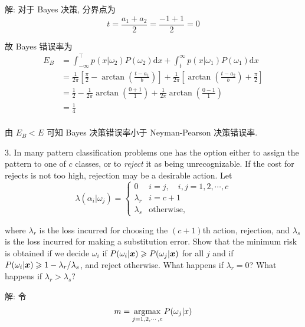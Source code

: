 \documentclass{article}
\begin{document}
解: 对于 Bayes 决策, 分界点为
\begin{equation}
  t=\frac{a_1+a_2}{2}=\frac{-1+1}{2}=0
\end{equation}

故 Bayes 错误率为
\begin{equation}
  \begin{aligned}
    E_B
    &=\int_{-\infty}^{\top} p(x|\omega_2)P(\omega_2)\mathrm{d}x+\int_t^\infty p(x|\omega_1)P(\omega_1)\mathrm{d}x\\
    &=\frac{1}{2\pi}\left[\frac{\pi}{2}-\arctan\left(\frac{t-a_1}{b}\right)\right]+\frac{1}{2\pi}\left[\arctan\left(\frac{t-a_2}{b}\right)+\frac{\pi}{2}\right]\\
    &=\frac{1}{2}-\frac{1}{2\pi}\arctan\left(\frac{0+1}{1}\right)+\frac{1}{2\pi}\arctan\left(\frac{0-1}{1}\right)\\
    &=\frac{1}{4}\\
  \end{aligned}
\end{equation}

由 $E_B<E$ 可知 Bayes 决策错误率小于 Neyman-Pearson 决策错误率.

3. In many pattern classification problems one has the option either to assign the pattern to one of $c$ classes, or to \emph{reject} it as being unrecognizable. If the cost for rejects is not too high, rejection may be a desirable action. Let
\begin{equation}
  \lambda(\alpha_i|\omega_j)=
  \left\{
    \begin{array}{ll}
    0         & i=j, \quad i,j=1,2,\cdots, c  \\
    \lambda_r & i = c+1 \\
    \lambda_s & \mathrm{otherwise},  
    \end{array}
  \right.
\end{equation}

where $\lambda_r$ is the loss incurred for choosing the $(c+1)$th action, rejection, and $\lambda_s$ is the loss incurred for making a substitution error. Show that the minimum risk is obtained if we decide $\omega_i$ if $P(\omega_i|\bm{x})\geqslant P(\omega_j|\bm{x})$ for all $j$ and if $P(\omega_i|\bm{x})\geqslant 1-\lambda_r/\lambda_s$, and reject otherwise. What happens if $\lambda_r=0$? What happens if $\lambda_r>\lambda_s$?

解: 令
\begin{equation}
  m=\operatorname*{argmax}_{j=1,2,\cdots,c}P(\omega_j|x)
\end{equation}
\end{document}
